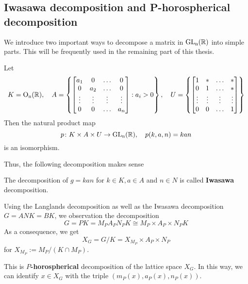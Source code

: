 \subsection{Iwasawa decomposition and P-horospherical decomposition}
We introduce two important ways to decompose a matrix in $\operatorname{\text{GL}_n(\mathbb{R})}$ into simple parts. This will be frequently used
in the remaining part of this thesis.
\begin{prop}
    Let \begin{align*}
        K=\operatorname{O_n(\mathbb{R})}, \quad A = \left\lbrace\begin{bmatrix}
                                         a_1    & 0      & \ldots & 0      \\
                                         0      & a_2    & \ldots & 0      \\
                                         \vdots & \vdots & \vdots & \vdots \\
                                         0      & 0      & \ldots & a_n
                                     \end{bmatrix}: a_i >0\right\rbrace, \quad
        U = \left\lbrace  \begin{bmatrix}
                              1      & \ast   & \ldots & \ast   \\
                              0      & 1      & \ldots & \ast   \\
                              \vdots & \vdots & \vdots & \vdots \\
                              0      & 0      & \ldots & 1\end{bmatrix}
        \right\rbrace
    \end{align*}
    Then the natural product map \[p \colon K \times A \times U \to \operatorname{\text{GL}_n(\mathbb{R})}, \quad p(k,a,n)=kan\]
    is an isomorphism.
\end{prop}
Thus, the following decomposition makes sense
\begin{definition}
    The decomposition of $g = kan$ for $k \in K, a \in A$ and $n \in N$ is called \textbf{Iwasawa} decomposition.
\end{definition}
Using the Langlands decomposition as well as the Iwasawa decomposition $G= ANK = BK$, we observation
the decomposition
\[G = PK = M_PA_PN_PK \cong M_P \times A_P \times N_PK\]
As a consequence, we get
\[X_G  = G/K = X_{M_P} \times A_P \times N_P\]
for $X_{M_P} := M_{P}/(K\cap M_P)$.

This is \textbf{$P$-horospherical} decomposition of the lattice space $X_G$. In this way,
we can identify  $x \in X_G$ with the triple $(m_P(x), a_P(x),n_P(x))$.

